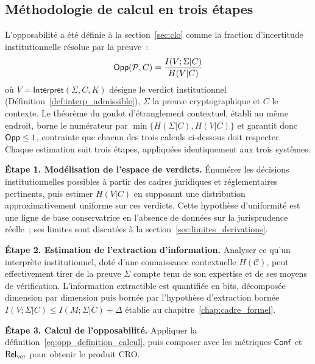 \begin{sloppypar}
\subsection{M\'ethodologie de calcul en trois \'etapes}
\label{sec:methodologie_calcul}

L'opposabilit\'e a \'et\'e d\'efinie \`a la section~\ref{sec:clo} comme la
fraction d'incertitude institutionnelle r\'esolue par la preuve~:
\begin{equation}
\mathsf{Opp}(\mathcal{P}, C) = \frac{I(V;\Sigma|C)}{H(V|C)}
\label{eq:opp_definition_calcul}
\end{equation}
o\`u $V = \mathsf{Interpret}(\Sigma, C, K)$ d\'esigne le verdict institutionnel
(D\'efinition~\ref{def:interp_admissible}),
$\Sigma$ la preuve cryptographique et $C$ le contexte. Le th\'eor\`eme du goulot
d'\'etranglement contextuel, \'etabli au m\^eme endroit, borne le num\'erateur
par $\min\{H(\Sigma|C), H(V|C)\}$ et garantit donc $\mathsf{Opp} \leq 1$, contrainte que chacun des trois calculs ci-dessous doit respecter.
Chaque estimation suit trois \'etapes, appliqu\'ees identiquement aux trois
syst\`emes.

\noindent\textbf{\'Etape 1. Mod\'elisation de l'espace de verdicts.}
\'Enum\'erer les d\'ecisions institutionnelles possibles \`a partir des cadres
juridiques et r\'eglementaires pertinents, puis estimer $H(V|C)$ en supposant une
distribution approximativement uniforme sur ces verdicts. Cette hypoth\`ese
d'uniformit\'e est une ligne de base conservatrice en l'absence de donn\'ees sur
la jurisprudence r\'eelle~; ses limites sont discut\'ees \`a la
section~\ref{sec:limites_derivations}.

\noindent\textbf{\'Etape 2. Estimation de l'extraction d'information.}
Analyser ce qu'un interpr\`ete institutionnel, dot\'e d'une connaissance
contextuelle $H(\mathcal{C})$, peut effectivement tirer de la preuve $\Sigma$
compte tenu de son expertise et de ses moyens de v\'erification. L'information
extractible est quantifi\'ee en bits, d\'ecompos\'ee dimension par dimension puis
born\'ee par l'hypoth\`ese d'extraction born\'ee
$I(V;\Sigma|C) \leq I(M;\Sigma|C) + \Delta$ \'etablie au
chapitre~\ref{chap:cadre_formel}.

\noindent\textbf{\'Etape 3. Calcul de l'opposabilit\'e.}
Appliquer la d\'efinition~\eqref{eq:opp_definition_calcul}, puis composer avec
les m\'etriques $\mathsf{Conf}$ et $\mathsf{Rel}_{\mathrm{ver}}$ pour obtenir le produit CRO.


\end{sloppypar}
